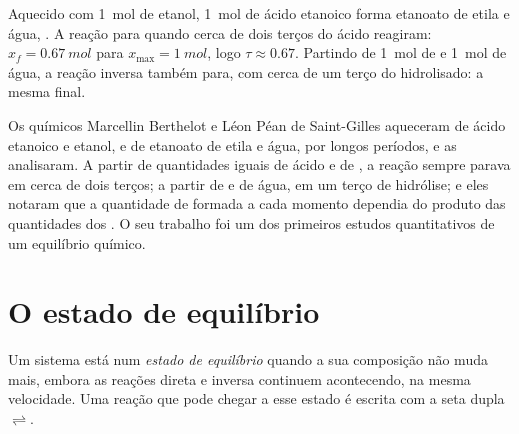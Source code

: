 \begin{example}\label{ex:g12:equilibrium:berthelot}
Aquecido com \qty{1}{mol} de etanol, \qty{1}{mol} de ácido etanoico
forma etanoato de etila e água,
. A reação para quando cerca
de dois terços do ácido reagiram: $x_f = \qty{0.67}{mol}$ para
$x_{\max} = \qty{1}{mol}$, logo $\tau \approx 0.67$. Partindo de
\qty{1}{mol} de  e \qty{1}{mol} de água, a reação inversa também
para, com cerca de um terço do  hidrolisado: a mesma  final.
\end{example}

\begin{history}
Os químicos Marcellin Berthelot e Léon Péan de Saint-Gilles aqueceram
 de ácido etanoico e etanol, e de etanoato de etila e água, por
longos períodos, e as analisaram. A partir de quantidades iguais de
ácido e de , a reação sempre parava em cerca de dois terços; a
partir de  e de água, em um terço de hidrólise; e eles notaram que
a quantidade de  formada a cada momento dependia do produto das
quantidades dos . O seu trabalho foi um dos primeiros estudos
quantitativos de um equilíbrio químico.
\end{history}

\section{O estado de equilíbrio}

\begin{definition}\label{def:g12:equilibrium:equilibrium-state}
Um sistema está num \emph{estado de equilíbrio}
quando a sua composição não muda mais, embora as reações direta e
inversa continuem acontecendo, na mesma velocidade. Uma reação que pode
chegar a esse estado é escrita com a seta dupla $\rightleftharpoons$.
\end{definition}

